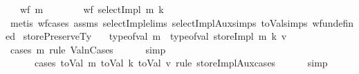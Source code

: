 \begin{isabellebody}
\ \ \ {\isachardoublequoteopen}wf\ m{\isachardoublequoteclose}\isanewline
\ \ \ \ \isanewline
\ \ \ {\isachardoublequoteopen}wf\ {\isacharparenleft}{\kern0pt}selectImpl\ m\ k{\isacharparenright}{\kern0pt}{\isachardoublequoteclose}\isanewline
%
\isadelimproof
\ \ %
\endisadelimproof
%
\isatagproof
{}\isamarkupfalse%
\ {\isacharparenleft}{\kern0pt}metis\ wf{\isachardot}{\kern0pt}cases\ assms{\isacharparenleft}{\kern0pt}{}{\isacharparenright}{\kern0pt}\ selectImpl{\isachardot}{\kern0pt}elims\ selectImplAux{\isachardot}{\kern0pt}simps{\isacharparenleft}{\kern0pt}{}{\isacharcomma}{\kern0pt}{}{\isacharparenright}{\kern0pt}\ toVal{}{}{}{}{\isachardot}{\kern0pt}simps{\isacharparenleft}{\kern0pt}{}{\isacharcomma}{\kern0pt}{}{\isacharparenright}{\kern0pt}\ wf{\isacharunderscore}{\kern0pt}undefined{\isacharparenright}{\kern0pt}%
\endisatagproof
{\isafoldproof}%
%
\isadelimproof
\isanewline
%
\endisadelimproof
\isanewline
{}\isamarkupfalse%
\ storePreserveTy{\isacharcolon}{\kern0pt}\isanewline
\ \ \ {\isachardoublequoteopen}type{\isacharunderscore}{\kern0pt}of{\isacharunderscore}{\kern0pt}val\ m\ {\isacharequal}{\kern0pt}\ type{\isacharunderscore}{\kern0pt}of{\isacharunderscore}{\kern0pt}val\ {\isacharparenleft}{\kern0pt}storeImpl\ m\ k\ v{\isacharparenright}{\kern0pt}{\isachardoublequoteclose}\isanewline
%
\isadelimproof
\ \ %
\endisadelimproof
%
\isatagproof
{}\isamarkupfalse%
\ {\isacharparenleft}{\kern0pt}cases\ m\ rule{\isacharcolon}{\kern0pt}\ ValnCases{\isacharsemicolon}{\kern0pt}\isanewline
\ \ \ \ \ \ {\isacharparenleft}{\kern0pt}simp{\isacharparenright}{\kern0pt}{\isacharsemicolon}{\kern0pt}\isanewline
\ \ \ \ \ \ cases\ {\isachardoublequoteopen}{\isacharparenleft}{\kern0pt}{\isacharparenleft}{\kern0pt}toVal{}{}{}{}\ m{\isacharparenright}{\kern0pt}{\isacharcomma}{\kern0pt}\ {\isacharparenleft}{\kern0pt}toVal{}{}{}{}\ k{\isacharparenright}{\kern0pt}{\isacharcomma}{\kern0pt}\ {\isacharparenleft}{\kern0pt}toVal{}{}{}{}\ v{\isacharparenright}{\kern0pt}{\isacharparenright}{\kern0pt}{\isachardoublequoteclose}\ rule{\isacharcolon}{\kern0pt}\ storeImplAux{\isachardot}{\kern0pt}cases{\isacharsemicolon}{\kern0pt}\isanewline
\ \ \ \ \ \ {\isacharparenleft}{\kern0pt}simp{\isacharparenright}{\kern0pt}{\isacharparenright}{\kern0pt}%

\end{isabellebody}
